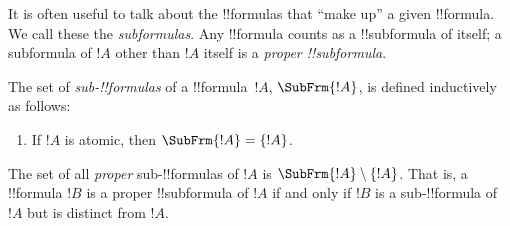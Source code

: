 \documentclass[../../include/open-logic-section]{subfiles}
\begin{document}


\begin{explain}
It is often useful to talk about the !!{formula}s that ``make up'' a given
!!{formula}.  We call these the \emph{subformulas}.  Any !!{formula} counts as
a !!{subformula} of itself; a subformula of $!A$ other than $!A$ itself is
a \emph{proper !!{subformula}}.
\end{explain}

\begin{defn}
The set of \emph{sub-!!{formula}s} of a !!{formula}~$!A$,
$\SubFrm{!A}$, is defined inductively as follows:
\begin{enumerate}
\item If $!A$ is atomic, then $\SubFrm{!A} = \{!A\}$.







\end{enumerate}
The set of all \emph{proper} sub-!!{formula}s of $!A$ is $\SubFrm{!A} \setminus
\{!A\}$. That is, a !!{formula} $!B$ is a proper !!{subformula} of $!A$ if and
only if $!B$ is a sub-!!{formula} of $!A$ but is distinct from $!A$.
\end{defn}

\end{document}
